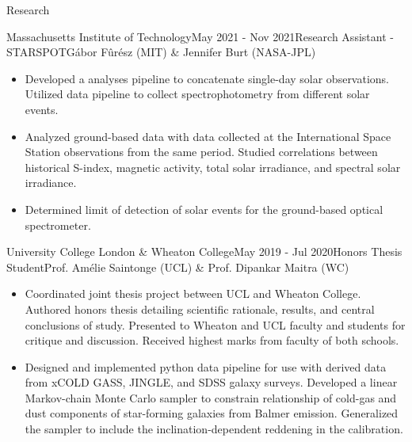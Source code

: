 \documentclass{resume} %
\begin{document}
\begin{rSection}{Research}
\begin{rSubsection}{Massachusetts Institute of Technology}{May 2021 - Nov 2021}{Research Assistant - STARSPOT}{G\'abor F\^ur\'esz (MIT) \& Jennifer Burt (NASA-JPL)}
\begin{itemize}
\item Developed a analyses pipeline to concatenate single-day solar observations. Utilized data pipeline to collect spectrophotometry from different solar events.
\item Analyzed ground-based data with data collected at the International Space Station observations from the same period. Studied correlations between historical S-index, magnetic activity, total solar irradiance, and spectral solar irradiance.
\item Determined limit of detection of solar events for the ground-based optical spectrometer.
\end{itemize}
\end{rSubsection}

\begin{rSubsection}{University College London \& Wheaton College}{May 2019 - Jul 2020}{Honors Thesis Student}{Prof. Am\'{e}lie Saintonge (UCL) \& Prof. Dipankar Maitra (WC)}
\begin{itemize}
\item Coordinated joint thesis project between UCL and Wheaton College. Authored honors thesis detailing scientific rationale, results, and central conclusions of study. Presented to Wheaton and UCL faculty and students for critique and discussion. Received highest marks from faculty of both schools.
\item Designed and implemented python data pipeline for use with derived data from xCOLD GASS, JINGLE, and SDSS galaxy surveys. Developed a linear Markov-chain Monte Carlo sampler to constrain relationship of cold-gas and dust components of star-forming galaxies from Balmer emission. Generalized the sampler to include the inclination-dependent reddening in the calibration.
\end{itemize}
\end{rSubsection}


\end{rSection}
\end{document}
